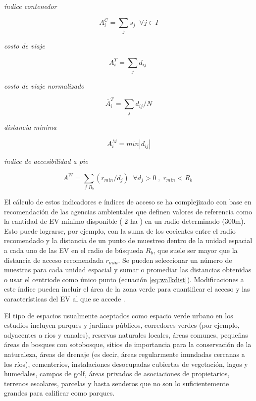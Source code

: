 \documentclass[12pt,]{book}
\begin{document}
\emph{índice contenedor}

\begin{equation}
A^{C}_i =\sum_j{s_j} \;  \; \forall  j \in I
\label{eq:contenedor}
\end{equation}

\emph{costo de viaje}

\begin{equation}
A^{T}_i =\sum_j{d_{ij}} \; 
\label{eq:costoviaje}
\end{equation}

\emph{costo de viaje normalizado}

\begin{equation}
\bar{A}^{T}_i =\sum_j{d_{ij}/N}
\label{eq:ncosto}
\end{equation}

\emph{distancia mínima}

\begin{equation}
A^{M}_i=min\left | d_{ij} \right | 
\label{eq:mindist}
\end{equation}

\emph{índice de accesibilidad a pie}

\begin{equation}
A^{W}= \sum_{\int R_b }{(r_{min}/d_j)}  \;  \; \forall  d_j>0 \; , \; r_{min}<R_b  \;
\label{eq:walkdist}
\end{equation}

El cálculo de estos indicadores e índices de acceso se ha complejizado
con base en recomendación de las agencias ambientales que definen
valores de referencia como la cantidad de EV mínimo disponible ( 2 ha )
en un radio determinado (300m). Esto puede lograrse, por ejemplo, con la
suma de los cocientes entre el radio recomendado y la distancia de un
punto de muestreo dentro de la unidad espacial a cada uno de las EV en
el radio de búsqueda \(R_b\), que suele ser mayor que la distancia de
acceso recomendada \(r_{min}\). Se pueden seleccionar un número de
muestras para cada unidad espacial y sumar o promediar las distancias
obtenidas \citep{zhou_social_2013} o usar el centriode como único punto
(ecuación \eqref{eq:walkdist}). Modificaciones a este índice pueden
incluir el área de la zona verde para cuantificar el acceso y las
características del EV al que se accede \citep{comber_using_2008}.

El tipo de espacios usualmente aceptados como espacio verde urbano en
los estudios incluyen parques y jardines públicos, corredores verdes
(por ejemplo, adyacentes a ríos y canales), reservas naturales locales,
áreas comunes, pequeñas áreas de bosques con sotobosque, sitios de
importancia para la conservación de la naturaleza, áreas de drenaje (es
decir, áreas regularmente inundadas cercanas a los ríos), cementerios,
instalaciones desocupadas cubiertas de vegetación, lagos y humedales,
campos de golf, áreas privados de asociaciones de propietarios, terrenos
escolares, parcelas y hasta senderos que no son lo suficientemente
grandes para calificar como
parques\citep{nesbitt_exploring_2016, comber_using_2008, kabisch_green_2014, zhou_social_2013}.
\end{document}
